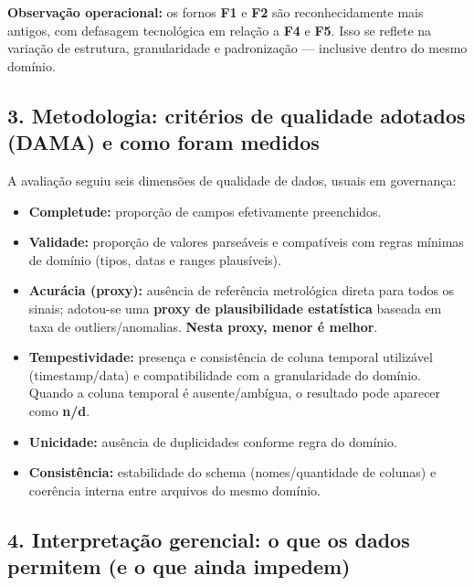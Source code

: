 \textbf{Observação operacional:} os fornos \textbf{F1} e \textbf{F2} são
reconhecidamente mais antigos, com defasagem tecnológica em relação a
\textbf{F4} e \textbf{F5}. Isso se reflete na variação de estrutura,
granularidade e padronização --- inclusive dentro do mesmo domínio.

\newpage

\subsection{\texorpdfstring{\textbf{3. Metodologia: critérios de
qualidade adotados (DAMA) e como foram
medidos}}{3. Metodologia: critérios de qualidade adotados (DAMA) e como foram medidos}}\label{metodologia-crituxe9rios-de-qualidade-adotados-dama-e-como-foram-medidos}

A avaliação seguiu seis dimensões de qualidade de dados, usuais em
governança:

\begin{itemize}
\tightlist
\item
  \textbf{Completude:} proporção de campos efetivamente preenchidos.\\
\item
  \textbf{Validade:} proporção de valores parseáveis e compatíveis com
  regras mínimas de domínio (tipos, datas e ranges plausíveis).\\
\item
  \textbf{Acurácia (proxy):} ausência de referência metrológica direta
  para todos os sinais; adotou-se uma \textbf{proxy de plausibilidade
  estatística} baseada em taxa de outliers/anomalias. \textbf{Nesta
  proxy, menor é melhor}.\\
\item
  \textbf{Tempestividade:} presença e consistência de coluna temporal
  utilizável (timestamp/data) e compatibilidade com a granularidade do
  domínio. Quando a coluna temporal é ausente/ambígua, o resultado pode
  aparecer como \textbf{n/d}.\\
\item
  \textbf{Unicidade:} ausência de duplicidades conforme regra do
  domínio.\\
\item
  \textbf{Consistência:} estabilidade do schema (nomes/quantidade de
  colunas) e coerência interna entre arquivos do mesmo domínio.
\end{itemize}

\newpage

\subsection{\texorpdfstring{\textbf{4. Interpretação gerencial: o que os
dados permitem (e o que ainda
impedem)}}{4. Interpretação gerencial: o que os dados permitem (e o que ainda impedem)}}\label{interpretauxe7uxe3o-gerencial-o-que-os-dados-permitem-e-o-que-ainda-impedem}

